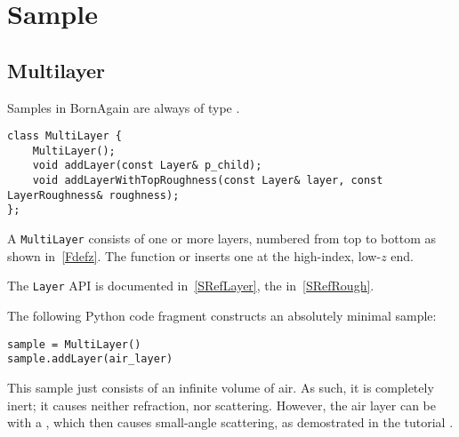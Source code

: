 
\chapter{Sample}\label{SRefSam}

\section{Multilayer}\label{SRefMuLay}

Samples in BornAgain are always of type .

\setCpp
\begin{lstlisting}
class MultiLayer {
    MultiLayer();
    void addLayer(const Layer& p_child);
    void addLayerWithTopRoughness(const Layer& layer, const LayerRoughness& roughness);
};
\end{lstlisting}

A \texttt{MultiLayer} consists of one or more layers,
numbered from top to bottom as shown in~\cref{Fdefz}.
The function  or 
inserts one  at the high-index, low-$z$ end.

The \texttt{Layer} API is documented in~\cref{SRefLayer},
the  in~\cref{SRefRough}.

The following Python code fragment constructs an absolutely minimal sample:

\setPy
\begin{lstlisting}
sample = MultiLayer()
sample.addLayer(air_layer)
\end{lstlisting}

This sample just consists of an infinite volume of air.
As such, it is completely inert; it causes neither refraction, nor scattering.
However, the air layer can be  with a ,
which then causes small-angle scattering,
as demostrated in the tutorial .

